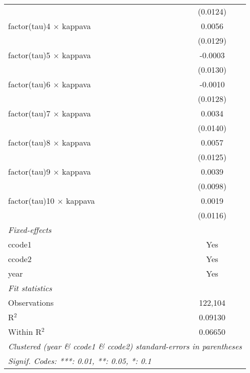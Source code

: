 \begin{tabular}{lc}
                                   & (0.0124)\\   
   factor(tau)4 $\times$ kappava   & 0.0056\\   
                                   & (0.0129)\\   
   factor(tau)5 $\times$ kappava   & -0.0003\\   
                                   & (0.0130)\\   
   factor(tau)6 $\times$ kappava   & -0.0010\\   
                                   & (0.0128)\\   
   factor(tau)7 $\times$ kappava   & 0.0034\\   
                                   & (0.0140)\\   
   factor(tau)8 $\times$ kappava   & 0.0057\\   
                                   & (0.0125)\\   
   factor(tau)9 $\times$ kappava   & 0.0039\\   
                                   & (0.0098)\\   
   factor(tau)10 $\times$ kappava  & 0.0019\\   
                                   & (0.0116)\\   
   \midrule
   \emph{Fixed-effects}\\
   ccode1                          & Yes\\  
   ccode2                          & Yes\\  
   year                            & Yes\\  
   \midrule
   \emph{Fit statistics}\\
   Observations                    & 122,104\\  
   R$^2$                           & 0.09130\\  
   Within R$^2$                    & 0.06650\\  
   \midrule \midrule
   \multicolumn{2}{l}{\emph{Clustered (year \& ccode1 \& ccode2) standard-errors in parentheses}}\\
   \multicolumn{2}{l}{\emph{Signif. Codes: ***: 0.01, **: 0.05, *: 0.1}}\\
\end{tabular}
\par\endgroup



